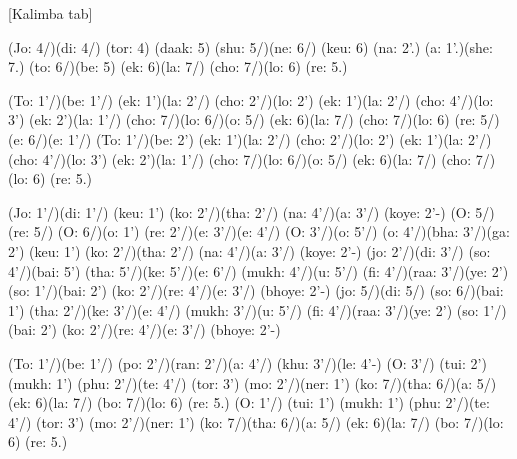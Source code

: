 \documentclass[11pt]{article}
\begin{document}
[Kalimba tab]
\begin{jianpu}
(Jo: 4/)(di: 4/) (tor: 4) (daak: 5) (shu: 5/)(ne: 6/) (keu: 6) (na: 2'.) (a: 1'.)(she: 7.)
(to: 6/)(be: 5) (ek: 6)(la: 7/) (cho: 7/)(lo: 6) (re: 5.)

(To: 1'/)(be: 1'/) (ek: 1')(la: 2'/) (cho: 2'/)(lo: 2') (ek: 1')(la: 2'/) (cho: 4'/)(lo: 3')
(ek: 2')(la: 1'/) (cho: 7/)(lo: 6/)(o: 5/) (ek: 6)(la: 7/) (cho: 7/)(lo: 6) (re: 5/)(e: 6/)(e: 1'/)
(To: 1'/)(be: 2') (ek: 1')(la: 2'/) (cho: 2'/)(lo: 2') (ek: 1')(la: 2'/) (cho: 4'/)(lo: 3')
(ek: 2')(la: 1'/) (cho: 7/)(lo: 6/)(o: 5/) (ek: 6)(la: 7/) (cho: 7/)(lo: 6) (re: 5.)

(Jo: 1'/)(di: 1'/) (keu: 1') (ko: 2'/)(tha: 2'/) (na: 4'/)(a: 3'/) (koye: 2'-)
(O: 5/) (re: 5/) (O: 6/)(o: 1') (re: 2'/)(e: 3'/)(e: 4'/) (O: 3'/)(o: 5'/) (o: 4'/)(bha: 3'/)(ga: 2')
(keu: 1') (ko: 2'/)(tha: 2'/) (na: 4'/)(a: 3'/) (koye: 2'-)
(jo: 2'/)(di: 3'/) (so: 4'/)(bai: 5') (tha: 5'/)(ke: 5'/)(e: 6'/) (mukh: 4'/)(u: 5'/) (fi: 4'/)(raa: 3'/)(ye: 2')
(so: 1'/)(bai: 2') (ko: 2'/)(re: 4'/)(e: 3'/) (bhoye: 2'-)
(jo: 5/)(di: 5/) (so: 6/)(bai: 1') (tha: 2'/)(ke: 3'/)(e: 4'/) (mukh: 3'/)(u: 5'/) (fi: 4'/)(raa: 3'/)(ye: 2')
(so: 1'/)(bai: 2') (ko: 2'/)(re: 4'/)(e: 3'/) (bhoye: 2'-)

(To: 1'/)(be: 1'/) (po: 2'/)(ran: 2'/)(a: 4'/) (khu: 3'/)(le: 4'-) (O: 3'/) (tui: 2') (mukh: 1') (phu: 2'/)(te: 4'/)
(tor: 3') (mo: 2'/)(ner: 1') (ko: 7/)(tha: 6/)(a: 5/) (ek: 6)(la: 7/) (bo: 7/)(lo: 6) (re: 5.)
(O: 1'/) (tui: 1') (mukh: 1') (phu: 2'/)(te: 4'/)
(tor: 3') (mo: 2'/)(ner: 1') (ko: 7/)(tha: 6/)(a: 5/) (ek: 6)(la: 7/) (bo: 7/)(lo: 6) (re: 5.)
\end{jianpu}
\end{document}
